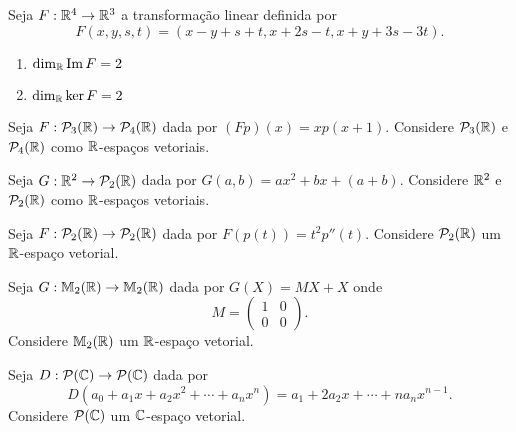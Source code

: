 \documentclass[12pt]{exam}
\begin{document}
\begin{exercicio}\label{nucleo_imagem_inicio}
  Seja $F : \mathbb{R}^4 \to \mathbb{R}^3$ a transforma\c{c}\~ao linear definida por
  \[
  F(x,y,s,t) = (x - y + s + t, x + 2s - t, x + y + 3s - 3t).
  \]
  \begin{solucao}
    \begin{enumerate}[label={\alph*})]
      \item $\dim_{\mathbb{R}}{\rm Im\,} F = 2$

      \item $\dim_{\mathbb{R}}\ker F = 2$
    \end{enumerate}
  \end{solucao}
\end{exercicio}

\begin{exercicio}
  Seja $F : \mathcal{P}_3(\mathbb{R}) \to \mathcal{P}_4(\mathbb{R})$ dada por $(Fp)(x) = xp(x + 1)$. Considere $\mathcal{P}_3(\mathbb{R})$ e $\mathcal{P}_4(\mathbb{R})$ como $\mathbb{R}$-espa\c{c}os vetoriais.
\end{exercicio}

\begin{exercicio}
  Seja $G : \mathbb{R}^2 \to \mathcal{P}_2(\mathbb{R})$ dada por $G(a,b) = ax^2 + bx + (a + b)$. Considere $\mathbb{R}^2$ e $\mathcal{P}_2(\mathbb{R})$ como $\mathbb{R}$-espa\c{c}os vetoriais.
\end{exercicio}

\begin{exercicio}
  Seja $F : \mathcal{P}_2(\mathbb{R}) \to \mathcal{P}_2(\mathbb{R})$ dada por $F(p(t)) = t^2p''(t)$. Considere $\mathcal{P}_2(\mathbb{R})$ um $\mathbb{R}$-espa\c{c}o vetorial.
\end{exercicio}

\begin{exercicio}
  Seja $G : \mathbb{M}_2(\mathbb{R}) \to \mathbb{M}_2(\mathbb{R})$ dada por $G(X) = MX + X$ onde
  \[
      M = \begin{pmatrix}
            1 & 0\\
            0 & 0
          \end{pmatrix}.
  \]
  Considere $\mathbb{M}_2(\mathbb{R})$ um $\mathbb{R}$-espa\c{c}o vetorial.
\end{exercicio}

\begin{exercicio}
  Seja $D : \mathcal{P}(\mathbb{C}) \to \mathcal{P}(\mathbb{C})$ dada por
  \[
      D(a_0 + a_1x + a_2x^2 + \cdots + a_nx^n) = a_1 + 2a_2x + \cdots + na_nx^{n - 1}.
  \]
  Considere $\mathcal{P}(\mathbb{C})$ um $\mathbb{C}$-espa\c{c}o vetorial.
\end{exercicio}
\end{document}
